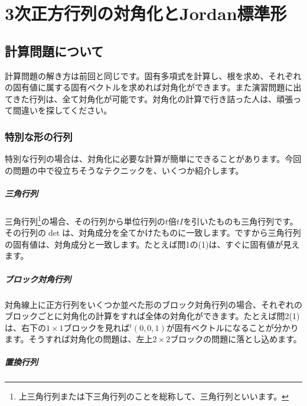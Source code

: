 \chapter{3次正方行列の対角化とJordan標準形}


\section{計算問題について}

計算問題の解き方は前回と同じです。固有多項式を計算し、根を求め、それぞれの固有値に属する固有ベクトルを求めれば対角化ができます。また演習問題に出てきた行列は、全て対角化が可能です。対角化の計算で行き詰った人は、頑張って間違いを探してください。

\subsection{特別な形の行列}

特別な行列の場合は、対角化に必要な計算が簡単にできることがあります。今回の問題の中で役立ちそうなテクニックを、いくつか紹介します。

\paragraph{三角行列}

三角行列\footnote{上三角行列または下三角行列のことを総称して、三角行列といいます。}の場合、その行列から単位行列の$t$倍$t I$を引いたものも三角行列です。その行列の$\det$は、対角成分を全てかけたものに一致します。ですから三角行列の固有値は、対角成分と一致します。たとえば問1の(1)は、すぐに固有値が見えます。

\paragraph{ブロック対角行列}

対角線上に正方行列をいくつか並べた形のブロック対角行列の場合、それぞれのブロックごとに対角化の計算をすれば全体の対角化ができます。たとえば問2(1)は、右下の$1 \times 1$ブロックを見れば${}^t(0, 0, 1)$が固有ベクトルになることが分かります。そうすれば対角化の問題は、左上$2 \times 2$ブロックの問題に落とし込めます。

\paragraph{置換行列}

